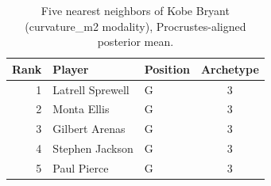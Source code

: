 \begin{table}[htbp]
  \centering\small
  \begin{tabular}{rllc}
    \toprule
    Rank & Player & Position & Archetype \\
    \midrule
    1 & Latrell Sprewell & G & 3 \\
    2 & Monta Ellis & G & 3 \\
    3 & Gilbert Arenas & G & 3 \\
    4 & Stephen Jackson & G & 3 \\
    5 & Paul Pierce & G & 3 \\
    \bottomrule
  \end{tabular}
  \caption{Five nearest neighbors of Kobe Bryant (curvature_m2 modality), Procrustes-aligned posterior mean.}
  \label{tab:Kobe_Bryant_neighbors_curvature_m2}
\end{table}

